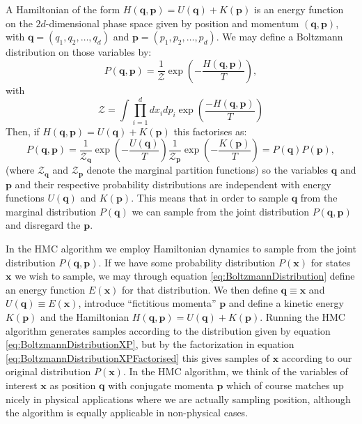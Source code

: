 \documentclass[12pt]{article}
\begin{document}
            A Hamiltonian of the form $H\left(\bm{q},\bm{p}\right)=U\left(\bm{q}\right)+K\left(\bm{p}\right)$ is an energy function on the $2d$-dimensional phase space given by position and momentum $\left(\bm{q},\bm{p}\right)$, with $\bm{q} = \left(q_{1},q_{2},\dots,q_{d}\right)$ and $\bm{p} = \left(p_{1},p_{2},\dots,p_{d}\right)$. We may define a Boltzmann distribution on those variables by:
            \begin{equation}
                \label{eq:BoltzmannDistributionXP}
                P\left(\bm{q},\bm{p}\right) = \frac{1}{\mathcal{Z}}\exp{\left(-\frac{H\left(\bm{q},\bm{p}\right)}{T} \right)},
            \end{equation}
            with 
            \begin{equation}
                \mathcal{Z} = \int\prod_{i=1}^{d}dx_{i}dp_{i} \exp{\left(\frac{-H\left(\bm{q},\bm{p}\right)}{T}\right)}
            \end{equation}
            Then, if $H\left(\bm{q},\bm{p}\right) = U\left(\bm{q}\right) + K\left(\bm{p}\right)$ this factorises as:
            \begin{equation}
                \label{eq:BoltzmannDistributionXPFactorised}
                P\left(\bm{q},\bm{p}\right) = \frac{1}{\mathcal{Z}_{\bm{q}}}\exp{\left(-\frac{U\left(\bm{q}\right)}{T} \right)}\frac{1}{\mathcal{Z}_{\bm{p}}}\exp{\left(-\frac{K\left(\bm{p}\right)}{T} \right)} = P\left(\bm{q}\right) P\left(\bm{p}\right),
            \end{equation}
            (where $\mathcal{Z}_{\bm{q}}$ and $\mathcal{Z}_{\bm{p}}$ denote the marginal partition functions) so the variables $\bm{q}$ and $\bm{p}$ and their respective probability distributions are independent with energy functions $U\left(\bm{q}\right)$ and $K\left(\bm{p}\right)$. This means that in order to sample $\bm{q}$ from the marginal distribution $P\left(\bm{q}\right)$ we can sample from the joint distribution $P\left(\bm{q},\bm{p}\right)$ and disregard the $\bm{p}$. 

            In the HMC algorithm we employ Hamiltonian dynamics to sample from the joint distribution $P\left(\bm{q},\bm{p}\right)$. If we have some probability distribution $P\left(\bm{x}\right)$ for states $\bm{x}$ we wish to sample, we may through equation \ref{eq:BoltzmannDistribution} define an energy function $E\left(\bm{x}\right)$ for that distribution. We then define $\bm{q}\equiv\bm{x}$ and $U\left(\bm{q}\right) \equiv E\left(\bm{x}\right)$, introduce ``fictitious momenta'' $\bm{p}$ and define a kinetic energy $K\left(\bm{p}\right)$ and the Hamiltonian $H\left(\bm{q},\bm{p}\right) = U\left(\bm{q}\right) + K\left(\bm{p}\right)$. Running the HMC algorithm generates samples according to the distribution given by equation \ref{eq:BoltzmannDistributionXP}, but by the factorization in equation \ref{eq:BoltzmannDistributionXPFactorised} this gives samples of $\bm{x}$ according to our original distribution $P\left(\bm{x}\right)$. In the HMC algorithm, we think of the variables of interest $\bm{x}$ as position $\bm{q}$ with conjugate momenta $\bm{p}$ which of course matches up nicely in physical applications where we are actually sampling position, although the algorithm is equally applicable in non-physical cases.
\end{document}
